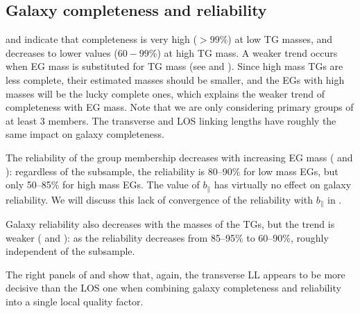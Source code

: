 \subsection{Galaxy completeness and reliability}

 and  indicate that
completeness is very high ($>99\%$) at low TG masses, and decreases to lower
values ($60-99\%$) at high TG mass. A weaker trend occurs when EG mass is
substituted for TG mass (see  and
). Since high mass TGs are less complete,
their estimated masses should be smaller, and the EGs with high masses will be
the lucky complete ones, which explains the weaker trend of completeness with
EG mass. Note that we are only considering primary groups of at least 3
members. The transverse and LOS linking lengths have roughly the same impact on
galaxy completeness.

The reliability of the group membership decreases with increasing EG mass
( and ):
regardless of the subsample, the reliability is 80--90\% for low mass EGs, but
only 50--85\% for high mass EGs. The value of $b_\parallel$ has virtually no
effect on galaxy reliability. We will discuss this lack of convergence of the
reliability with $b_\parallel$ in .

Galaxy reliability also decreases with the masses of the TGs, but the trend is
weaker ( and ): as
the reliability decreases from 85--95\% to 60--90\%, roughly independent of the
subsample.

The right panels of  and
 show that, again, the transverse LL appears
to be more decisive than the LOS one when combining galaxy completeness and
reliability into a single local quality factor.

